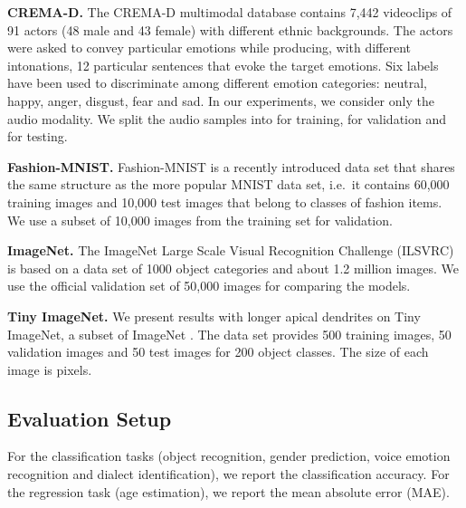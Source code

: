 \documentclass[pdflatex,sn-mathphys]{sn-jnl}
\theoremstyle{thmstyleone}
\theoremstyle{thmstyletwo}\newtheorem{example}{Example}\newtheorem{remark}{Remark}
\theoremstyle{thmstylethree}\newtheorem{definition}{Definition}\DeclareMathOperator{\sinc}{sinc}
\begin{document}
\noindent 
{\bf CREMA-D.}
The CREMA-D multimodal database \citep{Cao-TAC-2014} contains 7,442 videoclips of 91 actors (48 male and 43 female) with different ethnic backgrounds. The actors were asked to convey particular emotions while producing, with different intonations, 12 particular sentences that evoke the target emotions. Six labels have been used to discriminate among different emotion categories: neutral, happy, anger, disgust, fear and sad. In our experiments, we consider only the audio modality. We split the audio samples into  for training,  for validation and  for testing.


\noindent 
{\bf Fashion-MNIST.}
Fashion-MNIST \citep{Xiao-A-2017} is a recently introduced data set that shares the same structure as the more popular MNIST \citep{LeCun-PI-1998} data set, i.e.~it contains 60,000 training images and 10,000 test images that belong to  classes of fashion items. We use a subset of 10,000 images from the training set for validation. 

\noindent 
{\bf ImageNet.} The ImageNet Large Scale Visual Recognition Challenge (ILSVRC) \citep{Russakovsky-IJCV-2015} is based on a data set of 1000 object categories and about 1.2 million images. We use the official validation set of 50,000 images for comparing the models.

\noindent 
{\bf Tiny ImageNet.}
We present results with longer apical dendrites on Tiny ImageNet, a subset of ImageNet \citep{Russakovsky-IJCV-2015}. The data set provides 500 training images, 50 validation images and 50 test images for 200 object classes. The size of each image is  pixels.

\subsection{Evaluation Setup}
\label{sec_eval_setup}

For the classification tasks (object recognition, gender prediction, voice emotion recognition and dialect identification), we report the classification accuracy. For the regression task (age estimation), we report the mean absolute error (MAE).
\end{document}
